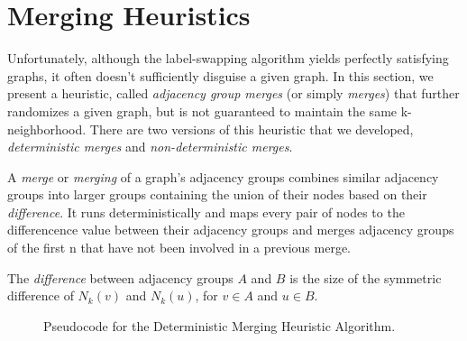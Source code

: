 \section{Merging Heuristics}
\indent Unfortunately, although the label-swapping algorithm yields perfectly satisfying graphs, it often doesn't sufficiently disguise a given graph.  In this section, we present a heuristic, called \emph{adjacency group merges} (or simply \emph{merges}) that further randomizes a given graph, but is not guaranteed to maintain the same k-neighborhood. There are two versions of this heuristic that we developed, \emph{deterministic merges} and \emph{non-deterministic merges}.

\begin{dfn}
\noindent A \emph{merge} or \emph{merging} of a graph's adjacency groups combines similar adjacency groups into larger groups containing the union of their nodes based on their \emph{difference}. It runs deterministically and maps every pair of nodes to  the differencence value between their adjacency groups and merges adjacency groups of the first n that have not been involved in a previous merge. \\
\end{dfn}

\begin{dfn}
The \emph{difference} between adjacency groups $A$ and $B$ is the size of the symmetric difference of $N_k(v)$ and $N_k(u)$, for $v \in A$ and $u \in B$. 
\end{dfn}

\begin{figure}[htb]
	\begin{algorithmic}
		\renewcommand{\algorithmicrequire}{\textbf{Input:}}
		\renewcommand{\algorithmicensure}{\textbf{Output:}}
			\EndFor
		\EndFor
		\EndFor
			\EndIf
		\EndIf
	\end{algorithmic}
	\caption{Pseudocode for the Deterministic Merging Heuristic Algorithm.}
	\label{fig:deterministic-merging}
\end{figure}

